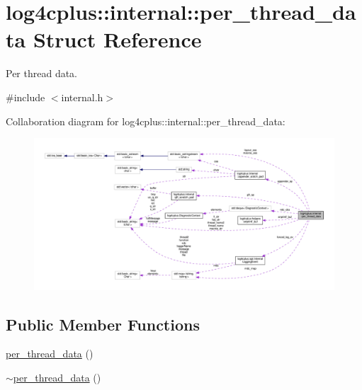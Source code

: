 \hypertarget{structlog4cplus_1_1internal_1_1per__thread__data}{\section{log4cplus\-:\-:internal\-:\-:per\-\_\-thread\-\_\-data Struct Reference}
\label{structlog4cplus_1_1internal_1_1per__thread__data}
}


Per thread data.  




{\ttfamily \#include $<$internal.\-h$>$}



Collaboration diagram for log4cplus\-:\-:internal\-:\-:per\-\_\-thread\-\_\-data\-:
\nopagebreak
\begin{figure}[H]
\begin{center}
\leavevmode
\includegraphics[width=350pt]{structlog4cplus_1_1internal_1_1per__thread__data__coll__graph}
\end{center}
\end{figure}
\subsection*{Public Member Functions}
\begin{DoxyCompactItemize}
\item 
\hyperlink{structlog4cplus_1_1internal_1_1per__thread__data_a98c657d9f0355cc56c8c16189389e243}{per\-\_\-thread\-\_\-data} ()
\item 
\hyperlink{structlog4cplus_1_1internal_1_1per__thread__data_a39ee5112f78621b2277d17fbd2b4a015}{$\sim$per\-\_\-thread\-\_\-data} ()
\end{DoxyCompactItemize}
